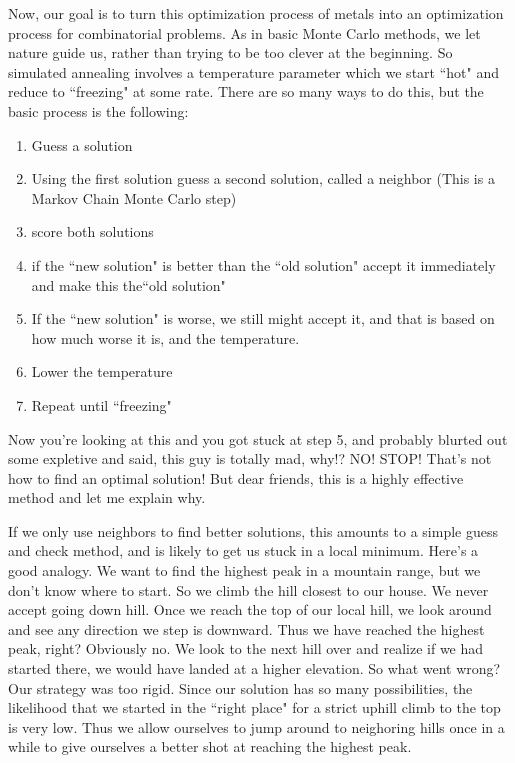 \documentclass{article}
\theoremstyle{definition}
\theoremstyle{remark}
\begin{document}
Now, our goal is to turn this optimization process of metals into an optimization process for combinatorial problems.  As in basic Monte Carlo methods, we let nature guide us, rather than trying to be too clever at the beginning.  So simulated annealing involves a temperature parameter which we start ``hot" and reduce to ``freezing" at some rate.  There are so many ways to do this, but the basic process is the following:
\begin{enumerate}
	\item Guess a solution
	\item Using the first solution guess a second solution, called a neighbor (This is a Markov Chain Monte Carlo step)
	\item score both solutions
	\item if the ``new solution" is better than the ``old solution" accept it immediately and make this the``old solution"
	\item If the ``new solution" is worse, we still might accept it, and that is based on how much worse it is, and the temperature.  
	\item Lower the temperature
	\item Repeat until ``freezing"
\end{enumerate}

Now you're looking at this and you got stuck at step 5, and probably blurted out some expletive and said, this guy is totally mad, why!? NO! STOP! That's not how to find an optimal solution!  But dear friends, this is a highly effective method and let me explain why.

If we only use neighbors to find better solutions, this amounts to a simple guess and check method, and is likely to get us stuck in a local minimum.  Here's a good analogy.  We want to find the highest peak in a mountain range, but we don't know where to start.  So we climb the hill closest to our house.  We never accept going down hill.  Once we reach the top of our local hill, we look around and see any direction we step is downward.  Thus we have reached the highest peak, right?  Obviously no.  We look to the next hill over and realize if we had started there, we would have landed at a higher elevation.  So what went wrong?  Our strategy was too rigid.  Since our solution has so many possibilities, the likelihood that we started in the ``right place" for a strict uphill climb to the top is very low.  Thus we allow ourselves to jump around to neighoring hills once in a while to give ourselves a better shot at reaching the highest peak.
\end{document}
